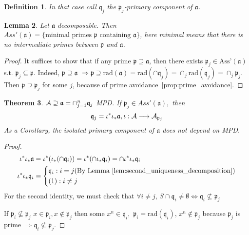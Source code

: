 \documentclass[11pt]{article}
\newtheorem{thm}{Theorem}[section]
\newtheorem{lemma}[thm]{Lemma}
\newtheorem{dfn}[thm]{Definition}
\newcommand{\sca}{{\mathfrak a}}
\newcommand{\scp}{{\mathfrak p}}
\newcommand{\scq}{\mathfrak q}
\newcommand{\cala}{{\cal A}}
\newcommand{\Lrta}{\Longrightarrow}
\newcommand{\lrta}{\longrightarrow}
\newcommand{\Llrta}{\Longleftrightarrow}
\begin{document}
\begin{dfn}
In that case call $\scq_j$ the $\scp_j$-primary component of  $\sca$.
\end{dfn}

\begin{lemma}
Let $\sca$ decomposable. Then $Ass'(\sca)=\{\text{minimal primes $\scp$ containing $\sca$}\}$, here minimal means that there is no intermediate primes between $\scp$
 and $\sca$.
\end{lemma}
\begin{proof}
It suffices to show that if any prime $\scp\supseteq \sca$, then there exists $\scp_j\in \text{Ass'}(\sca)$ s.t. $\scp_j\subseteq \scp$. Indeed, $\scp\supseteq\sca$ $\Lrta\scp\supseteq\text{rad}(\sca)=\text{rad}(\cap \scq_j)=\cap_j\text{rad}(\scq_j)=\cap_j\scp_j$. Then $\scp\supseteq\scp_j$ for some $j$, because of prime avoidance~\ref{prop:prime_avoidance}.
\end{proof}

\begin{thm}
$\cala\supseteq \sca=\cap_{j=1}^n\scq_j$ MPD. If $\scp_j \in Ass'(\sca),$ then 
$$
\scq_j=\iota^*\iota_*\sca,\iota:\cala\lrta \cala_{\scp_{j}}
$$
As a Corollary, the isolated primary component of $\sca$ does not depend on MPD.
\end{thm}
\begin{proof}
$$
\begin{aligned}
\iota^*\iota_*\sca&=\iota^*(\iota_*(\cap\scq_i))=\iota^*(\cap\iota_*\scq_i)=\cap\iota^*\iota_*\scq_i\\
\iota^*\iota_*\scq_i&
=\left\{
\begin{aligned}
&\scq_i: i= j(\text{By Lemma~\ref{lem:second_uniqueness_decomposition}})\\
& (1) :i\neq j
\end{aligned}
\right.
\end{aligned}
$$
For the second identity, we must check that $\forall i\neq j$, $S\cap \scq_i\neq \emptyset\Llrta \scq_i\not\subseteq \scp_j$

If $\scp_i\not\subseteq \scp_j$ $x\in\scp_i,x\notin\scp_j$ then some $x^n\in\scq_i,$ $\scp_i=\text{rad}(\scq_i)$, $x^n\notin \scp_j$ because $\scp_j$ is prime $\Lrta \scq_i\not\subseteq \scp_j$.
\end{proof}
\end{document}
